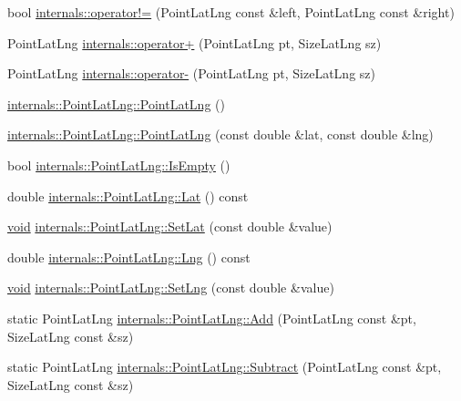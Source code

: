 \begin{DoxyCompactItemize}
\item 
bool \hyperlink{group___o_p_map_widget_ga50aa89260018f2e102183443c663b4b4}{internals\-::operator!=} (\-Point\-Lat\-Lng const \&left, \-Point\-Lat\-Lng const \&right)
\item 
\-Point\-Lat\-Lng \hyperlink{group___o_p_map_widget_ga0c71f763d92eeb6946eddcb6d939fddb}{internals\-::operator+} (\-Point\-Lat\-Lng pt, \-Size\-Lat\-Lng sz)
\item 
\-Point\-Lat\-Lng \hyperlink{group___o_p_map_widget_ga6bd5d678b59611b56100b7558d386ba0}{internals\-::operator-\/} (\-Point\-Lat\-Lng pt, \-Size\-Lat\-Lng sz)
\item 
\hyperlink{group___o_p_map_widget_ga1e0b690c0014f60cf7b9444345110709}{internals\-::\-Point\-Lat\-Lng\-::\-Point\-Lat\-Lng} ()
\item 
\hyperlink{group___o_p_map_widget_ga9d9ccecdc15490db949e762a8d5bfd25}{internals\-::\-Point\-Lat\-Lng\-::\-Point\-Lat\-Lng} (const double \&lat, const double \&lng)
\item 
bool \hyperlink{group___o_p_map_widget_gadcc729a47d0615eb914a429e90acc041}{internals\-::\-Point\-Lat\-Lng\-::\-Is\-Empty} ()
\item 
double \hyperlink{group___o_p_map_widget_gacf58e663626e5a88876d68937505dc64}{internals\-::\-Point\-Lat\-Lng\-::\-Lat} () const 
\item 
\hyperlink{group___u_a_v_objects_plugin_ga444cf2ff3f0ecbe028adce838d373f5c}{void} \hyperlink{group___o_p_map_widget_ga800a9e0154cc69ea20a677726a3a82c9}{internals\-::\-Point\-Lat\-Lng\-::\-Set\-Lat} (const double \&value)
\item 
double \hyperlink{group___o_p_map_widget_ga2a02db7101a66a3c2e5f536e60b38423}{internals\-::\-Point\-Lat\-Lng\-::\-Lng} () const 
\item 
\hyperlink{group___u_a_v_objects_plugin_ga444cf2ff3f0ecbe028adce838d373f5c}{void} \hyperlink{group___o_p_map_widget_gaa211add3899eb9c7ca5f82fad953461c}{internals\-::\-Point\-Lat\-Lng\-::\-Set\-Lng} (const double \&value)
\item 
static \-Point\-Lat\-Lng \hyperlink{group___o_p_map_widget_ga52f0413f61d22a37409a17892acf80cd}{internals\-::\-Point\-Lat\-Lng\-::\-Add} (\-Point\-Lat\-Lng const \&pt, \-Size\-Lat\-Lng const \&sz)
\item 
static \-Point\-Lat\-Lng \hyperlink{group___o_p_map_widget_ga1666139610f408d4ec78b5afafdff3d9}{internals\-::\-Point\-Lat\-Lng\-::\-Subtract} (\-Point\-Lat\-Lng const \&pt, \-Size\-Lat\-Lng const \&sz)
\item 

\end{DoxyCompactItemize}
